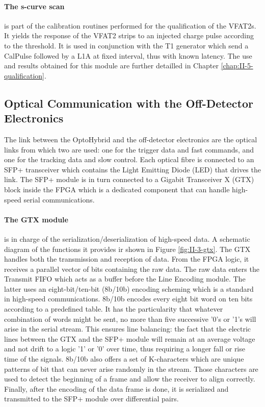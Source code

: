       \paragraph{The s-curve scan} is part of the calibration routines performed for the qualification of the VFAT2s. It yields the response of the VFAT2 strips to an injected charge pulse according to the threshold. It is used in conjunction with the T1 generator which send a CalPulse followed by a L1A at fixed interval, thus with known latency. The use and results obtained for this module are further detailled in Chapter \ref{chap:II-5-qualification}.

    \subsection{Optical Communication with the Off-Detector Electronics}

      The link between the OptoHybrid and the off-detector electronics are the optical links from which two are used: one for the trigger data and fast commands, and one for the tracking data and slow control. Each optical fibre is connected to an SFP+ transceiver which contains the Light Emitting Diode (LED) that drives the link. The SFP+ module is in turn connected to a Gigabit Transceiver X (GTX) block inside the FPGA which is a dedicated component that can handle high-speed serial communications.

      \paragraph{The GTX module} is in charge of the serialization/deserialization of high-speed data. A schematic diagram of the functions it provides ir shown in Figure \ref{fig:II-3-gtx}. The GTX handles both the transmission and reception of data. From the FPGA logic, it receives a parallel vector of bits containing the raw data. The raw data enters the Transmit FIFO which acts as a buffer before the Line Encoding module. The latter uses an eight-bit/ten-bit (8b/10b) encoding scheming which is a standard in high-speed communications. 8b/10b encodes every eight bit word on ten bits according to a predefined table. It has the particularity that whatever combination of words might be sent, no more than five successive '0's or '1's will arise in the serial stream. This ensures line balancing: the fact that the electric lines between the GTX and the SFP+ module will remain at an average voltage and not drift to a logic '1' or '0' over time, thus requiring a longer fall or rise time of the signals. 8b/10b also offers a set of K-characters which are unique patterns of bit that can never arise randomly in the stream. Those characters are used to detect the beginning of a frame and allow the receiver to align correctly. Finally, after the encoding of the data frame is done, it is serialized and transmitted to the SFP+ module over differential pairs. \\

